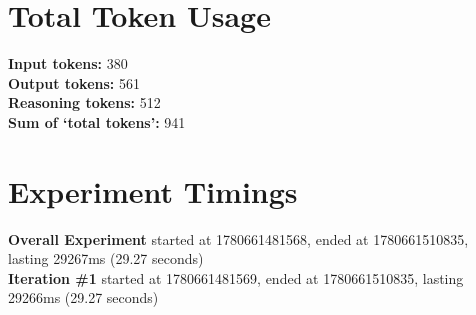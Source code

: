 \documentclass{article}
\begin{document}
\section*{Total Token Usage}
\textbf{Input tokens: }380
\\\textbf{Output tokens: }561
\\\textbf{Reasoning tokens: }512
\\\textbf{Sum of `total tokens': }941
\section*{Experiment Timings}
\textbf{Overall Experiment} started at 1780661481568, ended at 1780661510835, lasting 29267ms (29.27 seconds)
\\\textbf{Iteration \#1} started at 1780661481569, ended at 1780661510835, lasting 29266ms (29.27 seconds)
\end{document}
